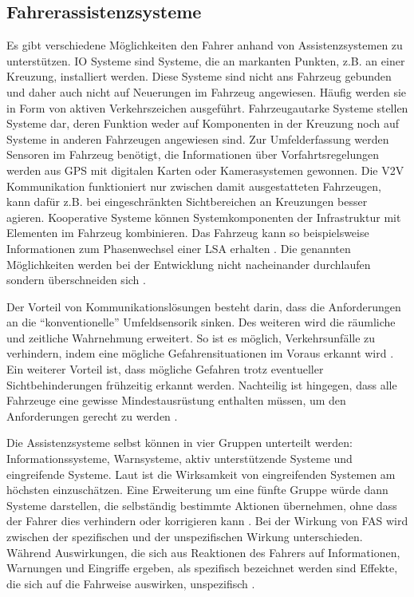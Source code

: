 \subsection{Fahrerassistenzsysteme}
Es gibt verschiedene Möglichkeiten den Fahrer anhand von Assistenzsystemen zu unterstützen. \ac{IO} Systeme sind Systeme, die an markanten Punkten, z.B. an einer Kreuzung, installiert werden. Diese Systeme sind nicht ans Fahrzeug gebunden und daher auch nicht auf Neuerungen im  Fahrzeug angewiesen. Häufig werden sie in Form von aktiven Verkehrszeichen ausgeführt. Fahrzeugautarke Systeme stellen Systeme dar, deren Funktion weder auf Komponenten in der Kreuzung noch auf Systeme in anderen Fahrzeugen angewiesen sind. Zur Umfelderfassung werden Sensoren im Fahrzeug benötigt, die Informationen über Vorfahrtsregelungen werden aus GPS mit digitalen Karten oder Kamerasystemen gewonnen. Die \ac{V2V} Kommunikation funktioniert nur zwischen damit ausgestatteten Fahrzeugen, kann dafür z.B. bei eingeschränkten Sichtbereichen an Kreuzungen besser agieren. Kooperative Systeme können Systemkomponenten der Infrastruktur mit Elementen im Fahrzeug kombinieren. Das Fahrzeug kann so beispielsweise Informationen zum Phasenwechsel einer LSA erhalten \parencite[S. 23-26]{Mages.2008}. Die genannten Möglichkeiten werden bei der Entwicklung nicht nacheinander durchlaufen sondern überschneiden sich \parencite[S. 88]{WissenschaflicherBeiratbeimBundesministerfurVerkehrBauundStadtentwicklung.2011}.

Der Vorteil von Kommunikationslösungen besteht darin, dass die Anforderungen an die \enquote{konventionelle} Umfeldsensorik sinken. Des weiteren wird die räumliche und zeitliche Wahrnehmung erweitert. So ist es möglich, Verkehrsunfälle zu verhindern, indem eine mögliche Gefahrensituationen im Voraus erkannt wird \parencite[S. 59]{Gerstenberger.17.02.2015}. Ein weiterer Vorteil ist, dass mögliche Gefahren trotz eventueller Sichtbehinderungen frühzeitig erkannt werden. Nachteilig ist hingegen, dass alle Fahrzeuge eine gewisse Mindestausrüstung enthalten müssen, um den Anforderungen gerecht zu werden \parencite[S. 2]{Mages.2008}.

Die Assistenzsysteme selbst können in vier Gruppen unterteilt werden: Informationssysteme, Warnsysteme, aktiv unterstützende Systeme und eingreifende Systeme. Laut \Textcite[S. 11]{Meitinger.2008} ist die Wirksamkeit von eingreifenden Systemen am höchsten einzuschätzen. Eine Erweiterung um eine fünfte Gruppe würde dann Systeme darstellen, die selbständig bestimmte Aktionen übernehmen, ohne dass der Fahrer dies verhindern oder korrigieren kann \parencite[S. 13]{Vollrath.2006}. Bei der Wirkung von FAS wird zwischen der spezifischen und der unspezifischen Wirkung unterschieden. Während Auswirkungen, die sich aus Reaktionen des Fahrers auf Informationen, Warnungen und Eingriffe ergeben, als spezifisch bezeichnet werden sind Effekte, die sich auf die Fahrweise auswirken, unspezifisch \parencite[S. 50f]{Grundl.2005}.

